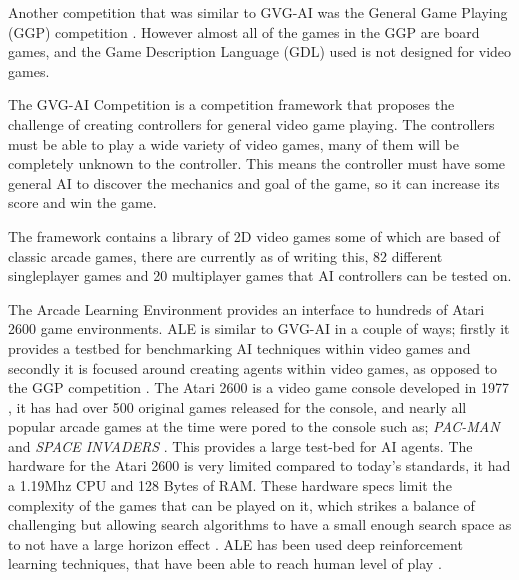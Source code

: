 \documentclass[journal]{IEEEtran}
\begin{document}
		
		Another competition that was similar to GVG-AI was the General Game Playing (GGP) competition \cite{GGP2005general, love2008general}. However almost all of the games in the GGP are board games, and the Game Description Language (GDL) used is not designed for video games.
		
		The GVG-AI Competition is a competition framework that proposes the challenge of creating controllers for general video game playing. The controllers must be able to play a wide variety of video games, many of them will be completely unknown to the controller. This means the controller must have some general AI to discover the mechanics and goal of the game, so it can increase its score and win the game. \cite{GVGAI, perez20162014}
		
		The framework contains a library of 2D video games some of which are based of classic arcade games, there are currently as of writing this, 82 different singleplayer games and 20 multiplayer games that AI controllers can be tested on.

		The Arcade Learning Environment \cite{bellemare2013arcade} provides an interface to hundreds of Atari 2600 game environments. ALE is similar to GVG-AI in a couple of ways; firstly it provides a testbed for benchmarking AI techniques within video games and secondly it is focused around creating agents within video games, as opposed to the GGP competition \cite{GGP2005general}.
		The Atari 2600 is a video game console developed in 1977 , it has had over 500 original games released for the console, and nearly all popular arcade games at the time were pored to the console such as; \textit{PAC-MAN} and \textit{SPACE INVADERS} \cite{bellemare2013arcade}. This provides a large test-bed for AI agents.
		The hardware for the Atari 2600 is very limited compared to today's standards, it had a 1.19Mhz CPU and 128 Bytes of RAM. These hardware specs limit the complexity of the games that can be played on it, which strikes a balance of challenging but allowing search algorithms to have a small enough search space as to not have a large horizon effect \cite{bellemare2013arcade}.
		ALE has been used deep reinforcement learning techniques, that have been able to reach human level of play \cite{mnih2015human, gaina2017rolling}.
		
\end{document}
